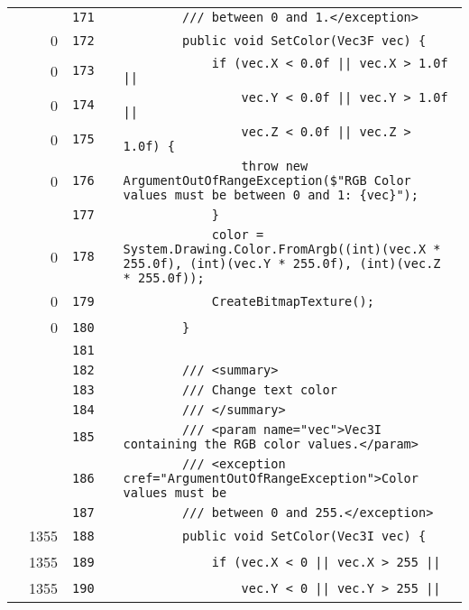 \documentclass[a4paper,landscape,10pt]{article}
\begin{document}
\begin{longtable}[l]{lrrll}
\cellcolor{gray} &  & \verb~171~ & & \verb~        /// between 0 and 1.</exception>~\\
\cellcolor{red} & 0 & \verb~172~ & & \verb~        public void SetColor(Vec3F vec) {~\\
\cellcolor{red} & 0 & \verb~173~ & & \verb~            if (vec.X < 0.0f || vec.X > 1.0f ||~\\
\cellcolor{red} & 0 & \verb~174~ & & \verb~                vec.Y < 0.0f || vec.Y > 1.0f ||~\\
\cellcolor{red} & 0 & \verb~175~ & & \verb~                vec.Z < 0.0f || vec.Z > 1.0f) {~\\
\cellcolor{red} & 0 & \verb~176~ & & \verb~                throw new ArgumentOutOfRangeException($"RGB Color values must be between 0 and 1: {vec}");~\\
\cellcolor{gray} &  & \verb~177~ & & \verb~            }~\\
\cellcolor{red} & 0 & \verb~178~ & & \verb~            color = System.Drawing.Color.FromArgb((int)(vec.X * 255.0f), (int)(vec.Y * 255.0f), (int)(vec.Z * 255.0f));~\\
\cellcolor{red} & 0 & \verb~179~ & & \verb~            CreateBitmapTexture();~\\
\cellcolor{red} & 0 & \verb~180~ & & \verb~        }~\\
\cellcolor{gray} &  & \verb~181~ & & \verb~~\\
\cellcolor{gray} &  & \verb~182~ & & \verb~        /// <summary>~\\
\cellcolor{gray} &  & \verb~183~ & & \verb~        /// Change text color~\\
\cellcolor{gray} &  & \verb~184~ & & \verb~        /// </summary>~\\
\cellcolor{gray} &  & \verb~185~ & & \verb~        /// <param name="vec">Vec3I containing the RGB color values.</param>~\\
\cellcolor{gray} &  & \verb~186~ & & \verb~        /// <exception cref="ArgumentOutOfRangeException">Color values must be~\\
\cellcolor{gray} &  & \verb~187~ & & \verb~        /// between 0 and 255.</exception>~\\
\cellcolor{green} & 1355 & \verb~188~ & & \verb~        public void SetColor(Vec3I vec) {~\\
\cellcolor{orange} & 1355 & \verb~189~ & & \verb~            if (vec.X < 0 || vec.X > 255 ||~\\
\cellcolor{green} & 1355 & \verb~190~ & & \verb~                vec.Y < 0 || vec.Y > 255 ||~\\

\end{longtable}
\end{document}
